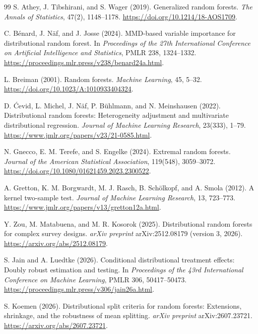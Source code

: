 \documentclass[12pt,a4paper]{article}
\newcommand{\1}{\mathbf 1}
\begin{document}
\begin{thebibliography}{99}
S. Athey, J. Tibshirani, and S. Wager (2019).
Generalized random forests.
\emph{The Annals of Statistics}, 47(2), 1148--1178.
\url{https://doi.org/10.1214/18-AOS1709}.

C. B\'enard, J. N\"af, and J. Josse (2024).
MMD-based variable importance for distributional random forest.
In \emph{Proceedings of the 27th International Conference on Artificial Intelligence and Statistics}, PMLR 238, 1324--1332.
\url{https://proceedings.mlr.press/v238/benard24a.html}.

L. Breiman (2001).
Random forests.
\emph{Machine Learning}, 45, 5--32.
\url{https://doi.org/10.1023/A:1010933404324}.

D. \'{C}evid, L. Michel, J. N\"af, P. B\"uhlmann, and N. Meinshausen (2022).
Distributional random forests: Heterogeneity adjustment and multivariate distributional regression.
\emph{Journal of Machine Learning Research}, 23(333), 1--79.
\url{https://www.jmlr.org/papers/v23/21-0585.html}.

N. Gnecco, E. M. Terefe, and S. Engelke (2024).
Extremal random forests.
\emph{Journal of the American Statistical Association}, 119(548), 3059--3072.
\url{https://doi.org/10.1080/01621459.2023.2300522}.

A. Gretton, K. M. Borgwardt, M. J. Rasch, B. Sch\"olkopf, and A. Smola (2012).
A kernel two-sample test.
\emph{Journal of Machine Learning Research}, 13, 723--773.
\url{https://www.jmlr.org/papers/v13/gretton12a.html}.

Y. Zou, M. Matabuena, and M. R. Kosorok (2025).
Distributional random forests for complex survey designs.
\emph{arXiv preprint} arXiv:2512.08179 (version 3, 2026).
\url{https://arxiv.org/abs/2512.08179}.

S. Jain and A. Luedtke (2026).
Conditional distributional treatment effects: Doubly robust estimation and testing.
In \emph{Proceedings of the 43rd International Conference on Machine Learning}, PMLR 306, 50417--50473.
\url{https://proceedings.mlr.press/v306/jain26a.html}.

S. Koemen (2026).
Distributional split criteria for random forests: Extensions, shrinkage, and the robustness of mean splitting.
\emph{arXiv preprint} arXiv:2607.23721.
\url{https://arxiv.org/abs/2607.23721}.


\end{thebibliography}
\end{document}

